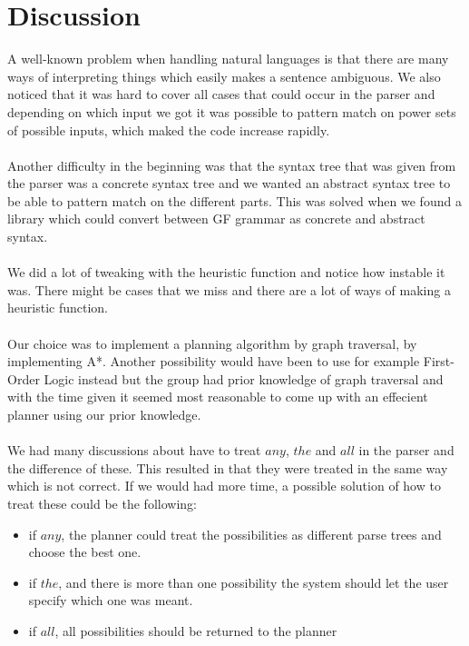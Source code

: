 \section{Discussion}
A well-known problem when handling natural languages is that there are many ways of interpreting
things which easily makes a sentence ambiguous. We also noticed that it was
hard to cover all cases that could occur in the parser and depending on which
input we got it was possible to pattern match on power sets of possible inputs,
which maked the code increase rapidly. \\\\
Another difficulty in the beginning was that the syntax tree that was given
from the parser was a concrete syntax tree and we wanted an abstract syntax
tree to be able to pattern match on the different parts. This was solved when
we found a library which could convert between GF grammar as concrete and
abstract syntax. \\\\
We did a lot of tweaking with the heuristic function and notice how instable it
was. There might be cases that we miss and there are a lot of ways of making a
heuristic function.
\\\\
Our choice was to implement a planning algorithm by graph traversal, by
implementing A*. Another possibility would have been to use for example First-Order
Logic instead but the group had prior knowledge of graph traversal and with the time 
given it seemed most reasonable to come up with an effecient planner using our prior knowledge. 
\\\\
We had many discussions about have to treat $any$, $the$ and $all$ in the
parser and the difference of these. This resulted in that they were treated in
the same way which is not correct. If we would had more time, a possible solution 
of how to treat these could be the following: 
\begin{itemize}
\item if $any$, the planner could treat the possibilities as different parse trees and choose the best one. 
\item if $the$, and there is more than one possibility the system should let the user specify which one was meant. 
\item if $all$, all possibilities should be returned to the planner
\end{itemize}
